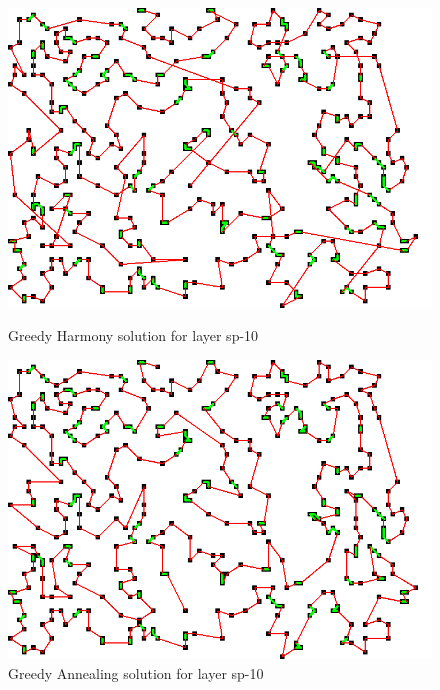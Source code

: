 \documentclass[titlepage]{article}
\newcommand{\multifigcaption}{\captionsetup{justification=justified}}
\begin{document}
\begin{figure}[H]
	\begin{center}
		\begin{minipage}{.45\linewidth}
			\includegraphics[width=\textwidth]{img/results/sp-10-greedy-harmony.png}
			\multifigcaption
			\caption{Greedy Harmony solution for layer sp-10 }
			\label{img:results/sp-10-greedy-harmony}
		\end{minipage}
		\hspace{.05\linewidth}
		\begin{minipage}{.45\linewidth}
			\includegraphics[width=\textwidth]{img/results/sp-10-greedy-annealing.png}
			\multifigcaption
			\caption{Greedy Annealing solution for layer sp-10}
			\label{img:results/sp-10-greedy-annealing}
		\end{minipage}	
		
	\end{center}
\end{figure}
\end{document}

